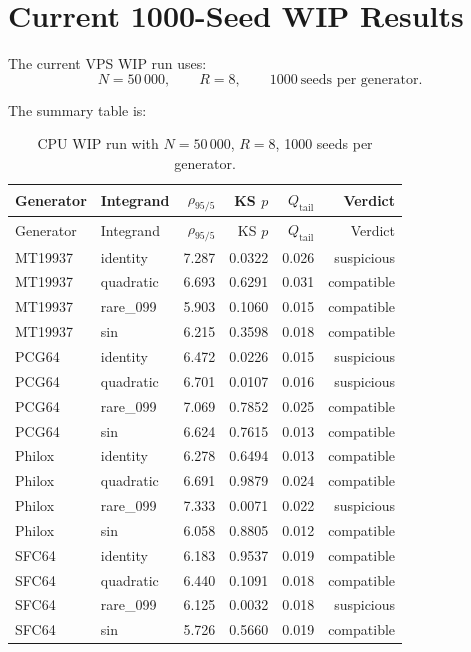 \documentclass[11pt,a4paper]{article}
\newcommand{\qtail}{Q_{\mathrm{tail}}}
\begin{document}
\section{Current 1000-Seed WIP Results}

The current VPS WIP run uses:
\[
N=50\,000,
\qquad
R=8,
\qquad
1000\ \text{seeds per generator}.
\]

The summary table is:

\begin{longtable}{llrrrr}
\caption{CPU WIP run with \(N=50\,000\), \(R=8\), 1000 seeds per generator.}\\
\toprule
Generator & Integrand & \(\rho_{95/5}\) & KS \(p\) & \(\qtail\) & Verdict \\
\midrule
\endfirsthead
\toprule
Generator & Integrand & \(\rho_{95/5}\) & KS \(p\) & \(\qtail\) & Verdict \\
\midrule
\endhead
MT19937 & identity  & 7.287 & 0.0322 & 0.026 & suspicious \\
MT19937 & quadratic & 6.693 & 0.6291 & 0.031 & compatible \\
MT19937 & rare\_099 & 5.903 & 0.1060 & 0.015 & compatible \\
MT19937 & sin       & 6.215 & 0.3598 & 0.018 & compatible \\
PCG64   & identity  & 6.472 & 0.0226 & 0.015 & suspicious \\
PCG64   & quadratic & 6.701 & 0.0107 & 0.016 & suspicious \\
PCG64   & rare\_099 & 7.069 & 0.7852 & 0.025 & compatible \\
PCG64   & sin       & 6.624 & 0.7615 & 0.013 & compatible \\
Philox  & identity  & 6.278 & 0.6494 & 0.013 & compatible \\
Philox  & quadratic & 6.691 & 0.9879 & 0.024 & compatible \\
Philox  & rare\_099 & 7.333 & 0.0071 & 0.022 & suspicious \\
Philox  & sin       & 6.058 & 0.8805 & 0.012 & compatible \\
SFC64   & identity  & 6.183 & 0.9537 & 0.019 & compatible \\
SFC64   & quadratic & 6.440 & 0.1091 & 0.018 & compatible \\
SFC64   & rare\_099 & 6.125 & 0.0032 & 0.018 & suspicious \\
SFC64   & sin       & 5.726 & 0.5660 & 0.019 & compatible \\
\bottomrule
\end{longtable}
\end{document}
